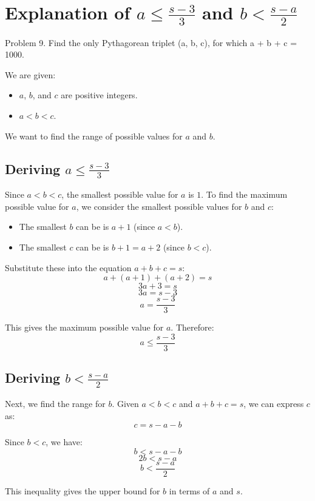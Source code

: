 \documentclass{article}
\begin{document}
\section*{Explanation of \( a \leq \frac{s-3}{3} \) and \( b < \frac{s-a}{2} \)}

Problem 9. Find the only Pythagorean triplet (a, b, c), for which a + b + c = 1000.

We are given:
\begin{itemize}
    \item \( a \), \( b \), and \( c \) are positive integers.
    \item \( a < b < c \).
\end{itemize}

We want to find the range of possible values for \( a \) and \( b \).

\subsection*{Deriving \( a \leq \frac{s-3}{3} \)}

Since \( a < b < c \), the smallest possible value for \( a \) is \( 1 \). To find the maximum possible value for \( a \), we consider the smallest possible values for \( b \) and \( c \):

\begin{itemize}
    \item The smallest \( b \) can be is \( a + 1 \) (since \( a < b \)).
    \item The smallest \( c \) can be is \( b + 1 = a + 2 \) (since \( b < c \)).
\end{itemize}

Substitute these into the equation \( a + b + c = s \):
\[
a + (a + 1) + (a + 2) = s
\]
\[
3a + 3 = s
\]
\[
3a = s - 3
\]
\[
a = \frac{s - 3}{3}
\]

This gives the maximum possible value for \( a \). Therefore:
\[
a \leq \frac{s - 3}{3}
\]

\subsection*{Deriving \( b < \frac{s - a}{2} \)}

Next, we find the range for \( b \). Given \( a < b < c \) and \( a + b + c = s \), we can express \( c \) as:
\[
c = s - a - b
\]

Since \( b < c \), we have:
\[
b < s - a - b
\]
\[
2b < s - a
\]
\[
b < \frac{s - a}{2}
\]

This inequality gives the upper bound for \( b \) in terms of \( a \) and \( s \).
\end{document}
